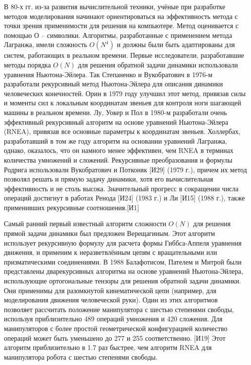 {	В 80-х гг. из-за развития вычислительной техники, учёные при разработке методов моделирования начинают ориентироваться на эффективность метода с точки зрения применимости для решения на компьютере.  Метод оценивается с помощью О – символики. Алгоритмы, разработанные с применением метода Лагранжа, имели сложность $O(N^4)$ и должны были быть адаптированы для систем, работающих в реальном времени. Первые исследователи, разработавшие методы порядка $O(N)$ для решения обратной задачи динамики использовали уравнения Ньютона-Эйлера. Так Степаненко и Вукобратович в 1976-м разработали рекурсивный метод Ньютона-Эйлера для описания динамики человеческих конечностей. Орин в 1979 году улучшил этот метод, привязав силы и моменты сил к локальным координатам звеньев для контроля ноги шагающей машины в реальном времени. Лу, Уокер и Пол в 1980-м разработали очень эффективный рекурсивный алгоритм на основе уравнений Ньютона-Эйлера (RNEA), привязав все основные параметры к координатам звеньев. Холлербах, разработавший в том же году алгоритм на основании уравнений Лагранжа, однако, оказалось, что он намного менее эффективен, чем RNEA в терминах количества умножений и сложений. Рекурсивные преобразования и формулы Родрига использовали Вукобратович и Потконяк [И29] (1979 г.), причем их метод позволял решать и прямую задачу динамики, хотя его вычислительная эффективность и не столь высока. Значительный прогресс в сокращении числа операций достигнут в работах Ренода [И24] (1983 г.) и Ли [И15] (1988 г.), также применивших рекурсивные соотношения.[И1]
	
	Самый ранний первый известный алгоритм сложности $O(N)$ для решения прямой задачи динамики был предложен Верещагиным. Этот алгоритм использует рекурсивную формулу для расчета формы Гиббса-Аппеля уравнения движения, и применим к неразветвлённым цепям с вращательными или призматическими соединениями. 
	В 1988 Балафотисом, Пателем и Митрой были представлены дварекурсивных алгоритма на основе уравнений Ньютона-Эйлера, использующие ортогональные тензоры для решения обратной задачи динамики. Они применимы для разомкнутой кинематической цепи (например, для моделирования движения человеческой руки). Один из этих алгоритмов позволяет рассчитать положение манипулятора с шестью степенями свободы, используя приблизительно 489 операций умножения и 420 сложения. Для манипуляторов с более простой геометрической конфигурацией количество операций может быть уменьшено до 277 и 255 соответственно. [И19] Этот алгоритм приблизительно в 1.7 раз быстрее, чем алгоритм RNEA для манипулятора робота с шестью степенями свободы.
	
}
